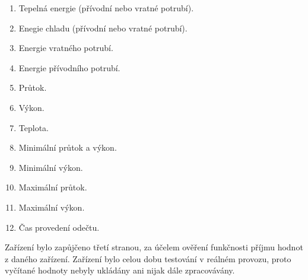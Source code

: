 	\begin{enumerate}
		\item Tepelná energie (přívodní nebo vratné potrubí).
		\item Enegie chladu (přívodní nebo vratné potrubí).
		\item Energie vratného potrubí.
		\item Energie přívodního potrubí.
		\item Průtok.
		\item Výkon.
		\item Teplota.
		\item Minimální průtok a výkon.
		\item Minimální výkon.
		\item Maximální průtok.
		\item Maximální výkon.
		\item Čas provedení odečtu.
	\end{enumerate}

\vspace{10pt}

Zařízení bylo zapůjčeno třetí stranou, za účelem ověření funkčnosti příjmu hodnot z daného zařízení. Zařízení bylo celou dobu testování v reálném provozu, proto vyčítané hodnoty nebyly ukládány ani nijak dále zpracovávány.

\newpage

